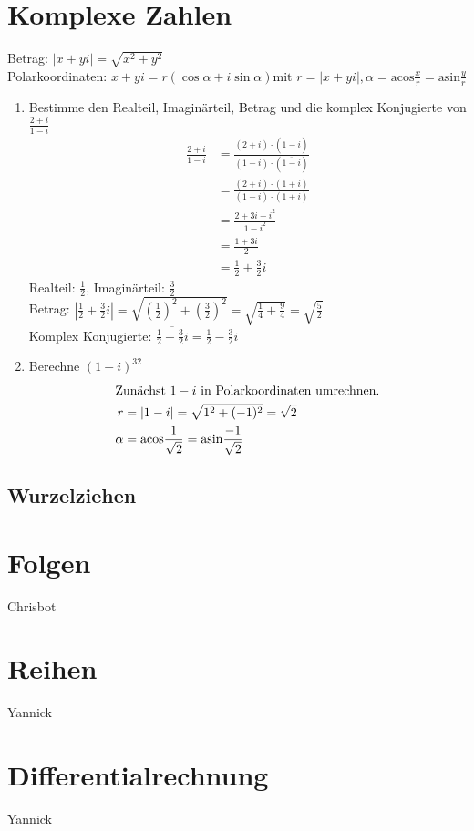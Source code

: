 \documentclass[11pt, a4paper]{article}
\providecommand{\abs}[1]{\left\lvert#1\right\rvert}
\providecommand{\acos}{\mathrm{acos}}
\providecommand{\asin}{\mathrm{asin}}
\begin{document}
\section{Komplexe Zahlen}
	Betrag: $\abs{x+yi} = \sqrt{x^2 + y^2}$ \\
	Polarkoordinaten: $x+yi = r \left( \cos{\alpha} + i \sin{\alpha} \right) \text{mit } r=\abs{x+yi}, \alpha = \acos{\frac{x}{r}} = \asin{\frac{y}{r}}$
	\begin{enumerate}
		\item Bestimme den Realteil, Imaginärteil, Betrag und die komplex Konjugierte von $\frac{2+i}{1-i}$
			\begin{align*}
				\frac{2+i}{1-i} &= \frac{(2+i) \cdot (\overline{1-i})}{(1-i) \cdot (\overline{1-i})} \\
				&= \frac{(2+i) \cdot (1+i)}{(1-i) \cdot (1+i)} \\
				&= \frac{2 + 3i + i^2}{1 - i^2} \\
				&= \frac{1 + 3i}{2} \\
				&= \frac{1}{2} + \frac{3}{2} i
			\end{align*}
			Realteil: $\frac{1}{2}$, Imaginärteil: $\frac{3}{2}$ \\
			Betrag: $\abs{\frac{1}{2} + \frac{3}{2} i} = \sqrt{(\frac{1}{2})^2 + (\frac{3}{2})^2} = \sqrt{\frac{1}{4} + \frac{9}{4}} = \sqrt{\frac{5}{2}}$ \\
			Komplex Konjugierte: $\overline{\frac{1}{2} + \frac{3}{2} i} = \frac{1}{2} - \frac{3}{2} i$
	\item Berechne $(1-i)^{32}$
		\begin{align*}
			\intertext{Zunächst $1-i$ in Polarkoordinaten umrechnen.}
			r &= \abs{1-i} = \sqrt{1^2 + (-1)^2} = \sqrt{2} \\
			\alpha &= \acos{\frac{1}{\sqrt{2}}} = \asin{\frac{-1}{\sqrt{2}}}
		\end{align*}
	\end{enumerate}
\subsection{Wurzelziehen}
\section{Folgen}
Chrisbot
\section{Reihen}
Yannick
\section{Differentialrechnung}
Yannick
\end{document}
